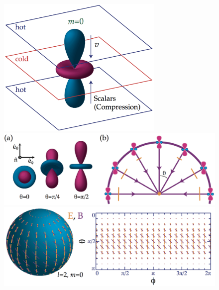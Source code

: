 \documentclass[a4paper,10pt]{article}
\begin{document}
\begin{figure}[t!]
\centering
\vspace{-1cm}
\includegraphics[width=8cm]{figures/ScalarQuadrupole.png}\\
\includegraphics[width=15cm]{figures/QuadrupolarAnisotropies.png}\\
\includegraphics[width=15cm]{figures/ScalarPattern.png}

\end{figure}
\end{document}
